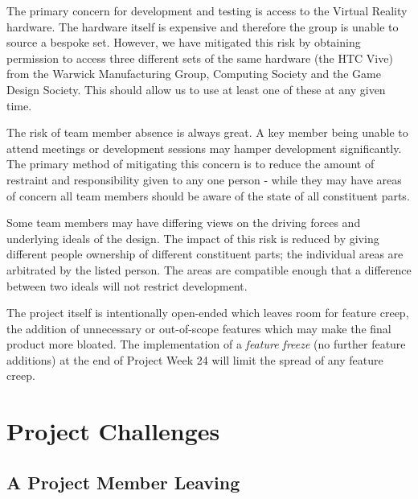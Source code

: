     \begin{description}[style=nextline]
            \item[\textbf{VR headset access}]
                The primary concern for development and testing is access to the Virtual Reality hardware. The hardware itself is expensive and therefore the group is unable to source a bespoke set. However, we have mitigated this risk by obtaining permission to access three different sets of the same hardware (the HTC Vive) from the Warwick Manufacturing Group, Computing Society and the Game Design Society. This should allow us to use at least one of these at any given time.
            \item[\textbf{Illness and absence}]
                The risk of team member absence is always great. A key member being unable to attend meetings or development sessions may hamper development significantly. The primary method of mitigating this concern is to reduce the amount of restraint and responsibility given to any one person - while they may have areas of concern all team members should be aware of the state of all constituent parts.
            \item[\textbf{Conflict of Interest}]
                Some team members may have differing views on the driving forces and underlying ideals of the design. The impact of this risk is reduced by giving different people ownership of different constituent parts; the individual areas are arbitrated by the listed person. The areas are compatible enough that a difference between two ideals will not restrict development.
            \item[\textbf{Feature creep}]
                The project itself is intentionally open-ended which leaves room for feature creep, the addition of unnecessary or out-of-scope features which may make the final product more bloated. The implementation of a \emph{feature freeze} (no further feature additions) at the end of Project Week 24 will limit the spread of any feature creep.
        \end{description}

\section{Project Challenges}

    \subsection{A Project Member Leaving}
    
